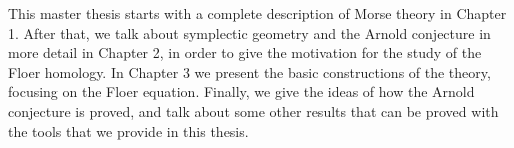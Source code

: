 This master thesis starts with a complete description of Morse theory in Chapter 1. After that, we talk about symplectic geometry and the Arnold conjecture in more detail in Chapter 2, in order to give the motivation for the study of the Floer homology. In Chapter 3 we present the basic constructions of the theory, focusing on the Floer equation. Finally, we give the ideas of how the Arnold conjecture is proved, and talk about some other results that can be proved with the tools that we provide in this thesis.
